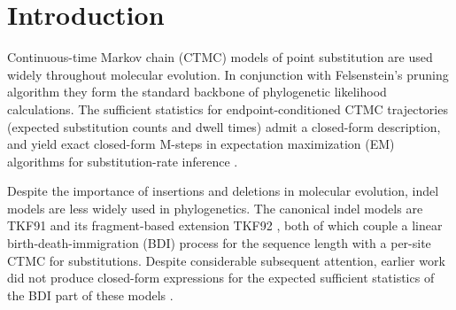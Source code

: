 \section{Introduction}
\label{sec:intro}

Continuous-time Markov chain (CTMC) models of point substitution are used
widely throughout molecular evolution.  In conjunction with Felsenstein's
pruning algorithm \cite{Felsenstein81} they form the standard backbone
of phylogenetic likelihood calculations.
The sufficient statistics for endpoint-conditioned CTMC trajectories
(expected substitution counts and dwell times) admit a closed-form
description, and yield exact closed-form M-steps in expectation
maximization (EM) algorithms for substitution-rate inference
\cite{HolmesRubin2002,HobolthJensen2005}.

Despite the importance of insertions and deletions in molecular evolution,
indel models are less widely used in phylogenetics.  The canonical
indel models are TKF91 \cite{ThorneEtAl91} and its fragment-based
extension TKF92 \cite{ThorneEtAl92}, both of which couple a linear
birth-death-immigration (BDI) process for the sequence length with
a per-site CTMC for substitutions.  Despite considerable subsequent
attention, earlier work did not produce closed-form expressions for
the expected sufficient statistics of the BDI part of these models
\cite{Holmes2005Envelope,CrawfordSuchard2012,DossEtAl2013,CrawfordMininSuchard2014}.

